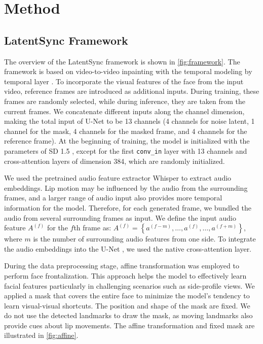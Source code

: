 \section{Method}

\subsection{LatentSync Framework}
The overview of the LatentSync framework is shown in \cref{fig:framework}. The framework is based on video-to-video inpainting with the temporal modeling by temporal layer \cite{guo2023animatediff}. To incorporate the visual features of the face from the input video, reference frames are introduced as additional inputs. During training, these frames are randomly selected, while during inference, they are taken from the current frames. We concatenate different inputs along the channel dimension, making the total input of U-Net to be 13 channels (4 channels for noise latent, 1 channel for the mask, 4 channels for the masked frame, and 4 channels for the reference frame). At the beginning of training, the model is initialized with the parameters of SD 1.5 \cite{rombach2022high}, except for the first \texttt{conv\_in} layer with 13 channels and cross-attention layers of dimension 384, which are randomly initialized.

We used the pretrained audio feature extractor Whisper \cite{radford2023robust} to extract audio embeddings. Lip motion may be influenced by the audio from the surrounding frames, and a larger range of audio input also provides more temporal information for the model. Therefore, for each generated frame, we bundled the audio from several surrounding frames as input. We define the input audio feature $A^{(f)}$ for the $f$th frame as: $A^{(f)} = \left\{ a^{(f-m)}, \dots, a^{(f)}, \dots, a^{(f+m)} \right\}$, where $m$ is the number of surrounding audio features from one side. To integrate the audio embeddings into the U-Net \cite{ronneberger2015u}, we used the native cross-attention layer.

During the data preprocessing stage, affine transformation was employed to perform face frontalization. This approach \cite{guan2023stylesync} helps the model to effectively learn facial features particularly in challenging scenarios such as side-profile views. We applied a mask that covers the entire face to minimize the model's tendency to learn visual-visual shortcuts. The position and shape of the mask are fixed. We do not use the detected landmarks \cite{lugaresi2019mediapipe,bulat2017far} to draw the mask, as moving landmarks also provide cues about lip movements. The affine transformation and fixed mask are illustrated in \cref{fig:affine}.

